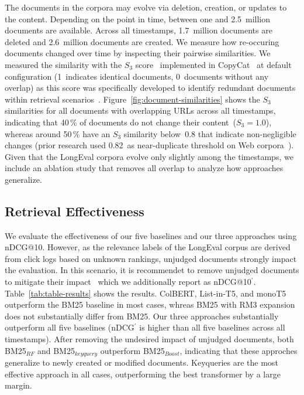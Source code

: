 The documents in the corpora may evolve via deletion, creation, or updates to the content. Depending on the point in time, between one and 2.5~million documents are available. Across all timestamps, 1.7~million documents are deleted and 2.6~million documents are created. We measure how re-occuring documents changed over time by inspecting their pairwise similarities. We measured the similarity with the $S_{3}$ score~\cite{bernstein:2005} implemented in CopyCat~\cite{froebe:2021a} at default configuration (1~indicates identical documents, 0~documents without any overlap) as this score was specifically developed to identify redundant documents within retrieval scenarios~\cite{bernstein:2005}. Figure~\ref{fig:document-similarities} shows the $S_{3}$ similarities for all documents with overlapping URLs across all timestamps, indicating that 40\,\% of documents do not change their content~($S_{3}=1.0$), whereas around 50\,\% have an $S_{3}$ similarity below~0.8 that indicate non-negligible changes (prior research used 0.82~as near-duplicate threshold on Web corpora~\cite{froebe:2021a}). Given that the LongEval corpora evolve only slightly among the timestamps, we include an ablation study that removes all overlap to analyze how approaches generalize.



\subsection{Retrieval Effectiveness}




We evaluate the effectiveness of our five baselines and our three approaches using nDCG@10. However, as the relevance labels of the LongEval corpus are derived from click logs based on unknown rankings, unjudged documents strongly impact the evaluation. In this scenario, it is recommendet to remove unjudged documents to mitigate their impact~\cite{sakai:2007} which we additionally report as nDCG@10$^{'}$. Table~\ref{tab:table-results} shows the results. ColBERT, List-in-T5, and monoT5 outperform the BM25 baseline in most cases, whreas BM25 with RM3 expansion does not substantially differ from BM25. Our three approaches substantially outperform all five baselines (nDCG$^{'}$ is higher than all five baselines across all timestamps). After removing the undesired impact of unjudged documents, both BM25$_{RF}$ and BM25$_{keyquery}$ outperform BM25$_{Boost}$, indicating that these approches generalize to newly created or modified documents. Keyqueries are the most effective approach in all cases, outperforming the best transformer by a large margin.

